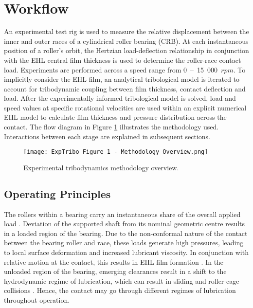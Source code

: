 \section{Workflow}

An experimental test rig is used to measure the relative displacement between the inner and outer races of a cylindrical roller bearing (CRB). At each instantaneous position of a roller's orbit, the Hertzian load-deflection relationship in conjunction with the EHL central film thickness is used to determine the roller-race contact load. Experiments are performed across a speed range from 0~–~15~000~$rpm$. To implicitly consider the EHL film, an analytical tribological model is iterated to account for tribodynamic coupling between film thickness, contact deflection and load. After the experimentally informed tribological model is solved, load and speed values at specific rotational velocities are used within an explicit numerical EHL model to calculate film thickness and pressure distribution across the contact. The flow diagram in Figure \ref{Experimental Tribodynamics Methodology Overview} illustrates the methodology used. Interactions between each stage are explained in subsequent sections.

\begin{figure}
	\centering
    \texttt{[image: ExpTribo Figure 1 - Methodology Overview.png]}
	\caption{Experimental tribodynamics methodology overview.}
	\label{Experimental Tribodynamics Methodology Overview}
\end{figure}

\subsection{Operating Principles}

The rollers within a bearing carry an instantaneous share of the overall applied load \cite{Guo2020}. Deviation of the supported shaft from its nominal geometric centre results in a loaded region of the bearing. Due to the non-conformal nature of the contact between the bearing roller and race, these loads generate high pressures, leading to local surface deformation and increased lubricant viscosity. In conjunction with relative motion at the contact, this results in EHL film formation \cite{Gohar1988} \cite{Grubin1949}. In the unloaded region of the bearing, emerging clearances result in a shift to the hydrodynamic regime of lubrication, which can result in sliding and roller-cage collisions \cite{Mohammadpour2015c}. Hence, the contact may go through different regimes of lubrication throughout operation\cite{Denni2019}.


